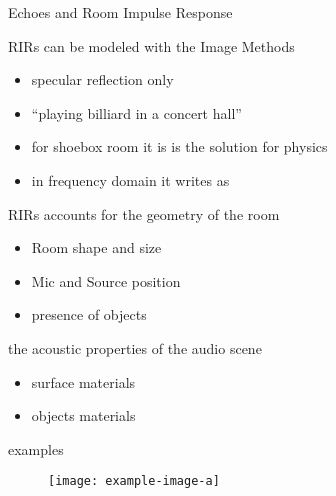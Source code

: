 \begin{frame}{Echoes and Room Impulse Response}

    \begin{block}{RIRs can be modeled with the Image Methods}
        \begin{itemize}
            \item specular reflection only
            \item ``playing billiard in a concert hall''
            \item for shoebox room it is is the solution for physics
            \item in frequency domain it writes as
        \end{itemize}
    \end{block}

    \begin{block}{RIRs accounts for}
        the \alert{geometry} of the room
        \begin{itemize}
            \item Room shape and size
            \item Mic and Source position
            \item presence of objects
        \end{itemize}
        the acoustic properties of the audio scene
        \begin{itemize}
            \item surface materials
            \item objects materials
        \end{itemize}
    \end{block}

    examples
    \begin{figure}
        \centering
        \texttt{[image: example-image-a]}
    \end{figure}

\end{frame}

